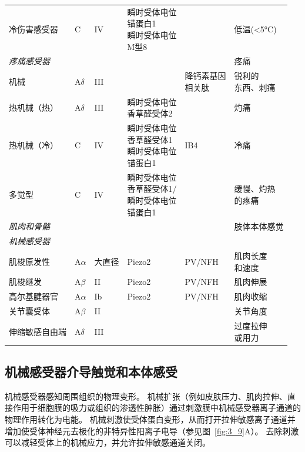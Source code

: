 \begin{table}[htbp]
\begin{tabular}{llllll}
		冷伤害感受器 & C & IV & \makecell[l]{瞬时受体电位\\锚蛋白1\\瞬时受体电位\\M型8} &  & 低温(<5°C) \\
		\textit{疼痛感受器} &  &  & &  & 疼痛 \\
		机械 & A$\delta$ & III & & \makecell{降钙素基因\\相关肽} & \makecell[l]{锐利的\\东西、刺痛} \\
		热机械（热） & A$\delta$ & III & \makecell[l]{瞬时受体电位\\香草醛受体2} &  & 灼痛 \\
		热机械（冷） & C & IV & \makecell[l]{瞬时受体电位\\香草醛受体1\\瞬时受体电位\\锚蛋白1} & IB4 & 冷痛 \\
		多觉型 & C & IV & \makecell[l]{瞬时受体电位\\香草醛受体1/\\瞬时受体电位\\锚蛋白1} &  & \makecell[l]{缓慢、灼热\\的疼痛} \\
		\textit{肌肉和骨骼} &  &  &  &  & 肢体本体感觉 \\
		\textit{机械感受器} &  &  &  &  &  \\
		肌梭原发性 & A$\alpha$ & 大直径 & Piezo2 & PV/NFH & \makecell[l]{肌肉长度\\和速度} \\
		肌梭继发 & A$\beta$ & II & Piezo2 & PV/NFH & 肌肉伸展 \\
		高尔基腱器官 & A$\alpha$ & Ib & Piezo2 & PV/NFH & 肌肉收缩 \\
		关节囊受体 & A$\beta$ & II &  &  & 关节角度 \\
		伸缩敏感自由端 & A$\delta$ & III &  &  & \makecell[l]{过度拉伸\\或用力} \\
		\bottomrule
	\end{tabular}
\end{table}


\subsection{机械感受器介导触觉和本体感受}

机械感受器感知周围组织的物理变形。
机械扩张（例如皮肤压力、肌肉拉伸、直接作用于细胞膜的吸力或组织的渗透性肿胀）通过刺激膜中机械感受器离子通道的物理作用转化为电能。
机械刺激使受体蛋白变形，从而打开拉伸敏感离子通道并增加使受体神经元去极化的非特异性阳离子电导（参见图~\ref{fig:3_9}A）。
去除刺激可以减轻受体上的机械应力，并允许拉伸敏感通道关闭。


